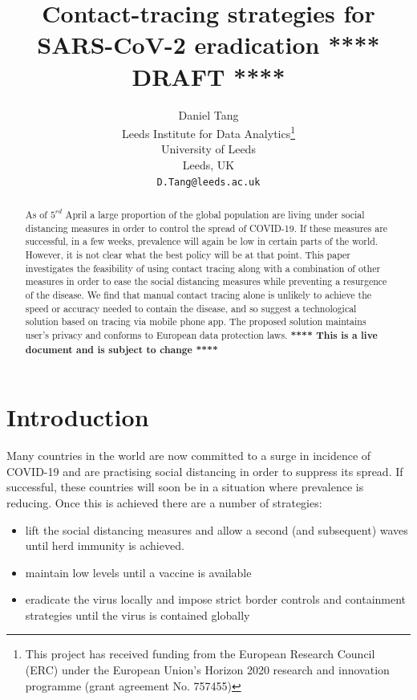 \documentclass{article}
\title{Contact-tracing strategies for SARS-CoV-2 eradication
\textbf{**** DRAFT ****}
}
\author{
  Daniel Tang\\
  Leeds Institute for Data Analytics\thanks{This project has received funding from the European Research Council (ERC) under the European Union’s Horizon 2020 research and innovation programme (grant agreement No. 757455)}\\
  University of Leeds\\
  Leeds, UK\\
  \texttt{D.Tang@leeds.ac.uk} \\
}
\begin{document}
\maketitle

\begin{abstract}
As of $5^{rd}$ April a large proportion of the global population are living under social distancing measures in order to control the spread of COVID-19. If these measures are successful, in a few weeks, prevalence will again be low in certain parts of the world. However, it is not clear what the best policy will be at that point. This paper investigates the feasibility of using contact tracing along with a combination of other measures in order to ease the social distancing measures while preventing a resurgence of the disease. We find that manual contact tracing alone is unlikely to achieve the speed or accuracy needed to contain the disease, and so suggest a technological solution based on tracing via mobile phone app. The proposed solution maintains user's privacy and conforms to European data protection laws.
\textbf{**** This is a live document and is subject to change ****}

\end{abstract}


\section{Introduction}

Many countries in the world are now committed to a surge in incidence of COVID-19 and are practising social distancing in order to suppress its spread. If successful, these countries will soon be in a situation where prevalence is reducing. Once this is achieved there are a number of strategies:
\begin{itemize}

\item lift the social distancing measures and allow a second (and subsequent) waves until herd immunity is achieved\cite{ferguson2020impact}.

\item maintain low levels until a vaccine is available

\item eradicate the virus locally and impose strict border controls and containment strategies until the virus is contained globally
\end{itemize}
\end{document}
